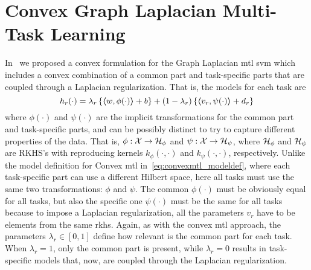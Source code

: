 


\section{Convex Graph Laplacian Multi-Task Learning}
\label{sec:convexgl}


In~\cite{RuizAD20} we proposed a convex formulation for the Graph Laplacian \acrshort{mtl} \acrshort{svm} which includes a convex combination of a common part and task-specific parts that are coupled through a Laplacian regularization.
That is, the models for each task are
\begin{equation}
    \nonumber
    h_r({\cdot}) = \lambda_r \left\lbrace \bm{\left\langle} w, \phi(\cdot) \bm{\right\rangle} + b  \right\rbrace + (1 - \lambda_r) \left\lbrace \bm{\left\langle} {v}_r, \psi(\cdot) \bm{\right\rangle} + d_r \right\rbrace
\end{equation}
where $\phi(\cdot)$ and $\psi(\cdot)$ are the implicit transformations for the common part and task-specific parts, and can be possibly distinct to try to capture different properties of the data.
That is, $\phi: \mathcal{X} \to \mathcal{H}_\phi$ and $\psi: \mathcal{X} \to \mathcal{H}_\psi$, where $\mathcal{H}_\phi$ and $\mathcal{H}_\psi$ are RKHS's with reproducing kernels $k_\phi(\cdot, \cdot)$ and $k_\psi(\cdot, \cdot)$, respectively.
Unlike the model definition for Convex \acrshort{mtl} in~\eqref{eq:convexmtl_modeldef}, where each task-specific part can use a different Hilbert space, here all tasks must use the same two transformations: $\phi$ and $\psi$. The common $\phi(\cdot)$ must be obviously equal for all tasks, but also the specific one $\psi(\cdot)$ must be the same for all tasks because to impose a Laplacian regularization, all the parameters $v_r$ have to be elements from the same \acrshort{rkhs}.
Again, as with the convex \acrshort{mtl} approach, the parameters $\lambda_r \in [0, 1]$ define how relevant is the common part for each task. When $\lambda_r=1$, only the common part is present, while $\lambda_r=0$ results in task-specific models that, now, are coupled through the Laplacian regularization.

